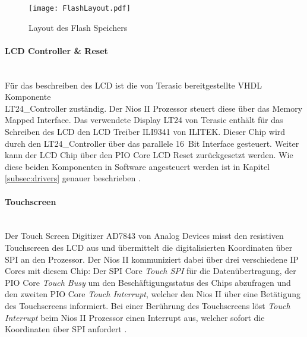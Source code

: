 \begin{figure}[h!]
	\centering
	\texttt{[image: FlashLayout.pdf]}
	\caption{Layout des Flash Speichers} 
	\label{img:FlashLayout}
\end{figure}  

\paragraph{LCD Controller \& Reset}\mbox{}\\

Für das beschreiben des LCD ist die von Terasic bereitgestellte VHDL Komponente\\ LT24\_Controller zuständig. Der Nios II Prozessor steuert diese über das Memory Mapped Interface. Das verwendete Display LT24 von Terasic enthält für das Schreiben des LCD den LCD Treiber ILI9341 von ILITEK. Dieser Chip wird durch den LT24\_Controller über das parallele \SI{16}{Bit} Interface gesteuert. Weiter kann der LCD Chip über den PIO Core LCD Reset zurückgesetzt werden. Wie diese beiden Komponenten in Software angesteuert werden ist in Kapitel \ref{subsec:drivers} genauer beschrieben \cite{LCD_Chip}.

\newpage

\paragraph{Touchscreen}\mbox{}\\

Der Touch Screen Digitizer AD7843 von Analog Devices misst den resistiven Touchscreen des LCD aus und übermittelt die digitalisierten Koordinaten über SPI an den Prozessor. Der Nios II kommuniziert dabei über drei verschiedene IP Cores mit diesem Chip: Der SPI Core \textit{Touch SPI} für die Datenübertragung, der PIO Core \textit{Touch Busy} um den Beschäftigungsstatus des Chips abzufragen und den zweiten PIO Core \textit{Touch Interrupt}, welcher den Nios II über eine Betätigung des Touchscreens informiert. Bei einer Berührung des Touchscreens löst \textit{Touch Interrupt} beim Nios II Prozessor einen Interrupt aus, welcher sofort die Koordinaten über SPI anfordert \cite{Touch_ADC}.